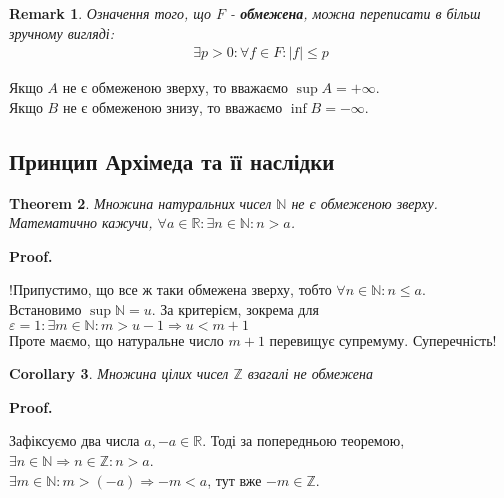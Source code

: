\documentclass[a4paper, 14pt]{article}
\makeatletter
\def\qed{$\blacksquare$}
\theoremstyle{theoremdd}
\newtheorem{theorem}{Theorem}[subsection]
\theoremstyle{theoremdd}
\theoremstyle{theoremdd}
\theoremstyle{theoremdd}
\theoremstyle{theoremdd}
\theoremstyle{theoremdd}
\newtheorem{remark}[theorem]{Remark}
\theoremstyle{theoremdd}
\theoremstyle{theoremdd}
\newtheorem{corollary}[theorem]{Corollary}
\renewenvironment{proof}[1][Proof.\\]{\par
\pushQED{\hfill \qed}%
\normalfont \topsep6\p@\@plus6\p@\relax
\trivlist
\item\relax
{\bfseries
#1\@addpunct{.}}\hspace\labelsep\ignorespaces
}{%
\popQED\endtrivlist\@endpefalse
}
\makeatother
\begin{document}
	\begin{remark}
	Означення того, що $F$ - \textbf{обмежена}, можна переписати в більш зручному вигляді:
	\begin{align*}
	\exists p>0: \forall f \in F: |f| \leq p
	\end{align*}
	\end{remark}
	Якщо $A$ не є обмеженою зверху, то вважаємо $\sup A = +\infty$.\\
	Якщо $B$ не є обмеженою знизу, то вважаємо $\inf B = -\infty$.\\
	
	\subsection{Принцип Архімеда та її наслідки}
	\begin{theorem}
	Множина натуральних чисел $\mathbb{N}$ не є обмеженою зверху.\\
	Математично кажучи, $\forall a \in \mathbb{R}: \exists n \in \mathbb{N}: n > a$.
	\end{theorem}
	
	\begin{proof}
	!Припустимо, що все ж таки обмежена зверху, тобто $\forall n \in \mathbb{N}: n \leq a$.\\
	Встановимо $\displaystyle\sup \mathbb{N} = u$. За критерієм, зокрема для $\varepsilon = 1: \exists m \in \mathbb{N}: m > u-1 \Rightarrow u < m+1$\\
	Проте маємо, що натуральне число $m+1$ перевищує супремуму. Суперечність!
	\end{proof}
	
	\begin{corollary}
	Множина цілих чисел $\mathbb{Z}$ взагалі не обмежена
	\end{corollary}
	
	\begin{proof}
	Зафіксуємо два числа $a,-a \in \mathbb{R}$. Тоді за попередньою теоремою,\\
	$\exists n \in \mathbb{N} \Rightarrow n \in \mathbb{Z}: n > a$.\\
	$\exists m \in \mathbb{N}: m > (-a) \Rightarrow -m < a$, тут вже $-m \in \mathbb{Z}$.
	\end{proof}
	
\end{document}
